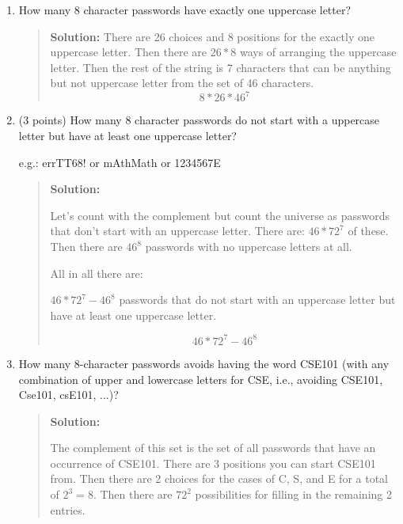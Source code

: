 \documentclass[10pt,letterpaper,unboxed,cm]{article}
\begin{document}
\begin{enumerate}
\begin{enumerate}
\begin{quote}
$$72^8-62^8$$
\end{quote}






\item

How many 8 character passwords have exactly one uppercase letter?

\begin{quote}
{\bf Solution:}
There are 26 choices and 8 positions for the exactly one uppercase letter. Then there are $26*8$ ways of arranging the uppercase letter. Then the rest of the string is 7 characters that can be anything but not uppercase letter from the set of 46 characters.
$$8*26*46^7$$

\end{quote}



\item
(3 points)
How many 8 character passwords do not start with a uppercase letter but have at least one uppercase letter?

e.g.: errTT68! or mAthMath or 1234567E
\begin{quote}
{\bf Solution:}

Let's count with the complement but count the universe as passwords that don't start with an uppercase letter. There are: $46*72^7$ of these. Then there are $46^8$ passwords with no uppercase letters at all.

All in all there are:

$46*72^7-46^8$ passwords that do not start with an uppercase letter but have at least one uppercase letter.

$$46*72^7-46^8$$
\end{quote}







\item

How many 8-character passwords avoids having the word CSE101 (with any combination of upper and lowercase letters for CSE, i.e., avoiding CSE101, Cse101, csE101, ...)?

\begin{quote}
{\bf Solution:}

The complement of this set is the set of all passwords that have an occurrence of CSE101. There are 3 positions you can start CSE101 from. Then there are 2 choices for the cases of C, S, and E for a total of $2^3=8$. Then there are $72^2$ possibilities for filling in the remaining 2 entries.


\end{quote}
\end{enumerate}
\end{enumerate}
\end{document}
